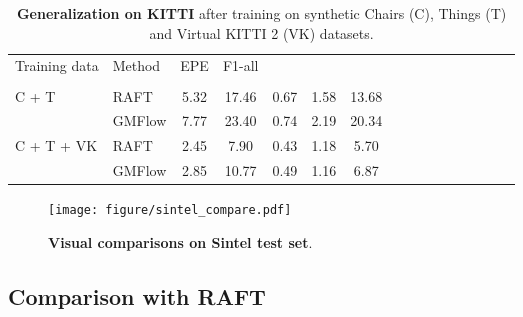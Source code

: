 \documentclass[10pt,twocolumn,letterpaper]{article}
\begin{document}
\begin{table}[t]
    \centering
    \setlength{\tabcolsep}{1.5pt} \begin{tabular}{llcccccccccccccc}
    \toprule
    
    Training data & Method & EPE & F1-all &  &  &  &   \\

    \addlinespace[-12pt] \\
    
    \midrule
    
    \multirow{2}{*}[-2pt]{C + T} & RAFT & 5.32 & 17.46 & 0.67 & 1.58 & 13.68 \\
    & GMFlow & 7.77 & 23.40 & 0.74 & 2.19 & 20.34 \\
    
    \midrule
    
    \multirow{2}{*}[-2pt]{C + T + VK} & RAFT & 2.45 & 7.90 & 0.43 & 1.18 & 5.70 \\
    & GMFlow & 2.85 & 10.77 & 0.49 & 1.16 & 6.87 \\


    \bottomrule
    \end{tabular}
    \vspace{-8pt}
    \caption{\textbf{Generalization on KITTI} after training on synthetic Chairs (C), Things (T) and Virtual KITTI 2 (VK) datasets. 
    }
    \label{tab:gen_kitti}
    \vspace{-16pt}
    
    
\end{table}








\begin{figure*}[t]
    \centering
    \texttt{[image: figure/sintel\_compare.pdf]}
    \vspace{-8pt}
    \caption{\textbf{Visual comparisons on Sintel test set}.}
    \label{fig:sintel_test}
    \vspace{-12pt}
\end{figure*}



\subsection{Comparison with RAFT}
\label{sec:compare_raft}
\end{document}
